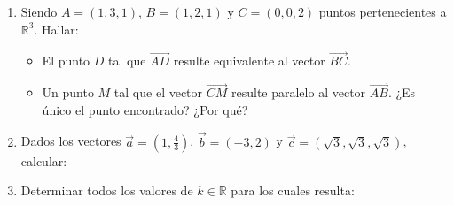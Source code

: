 \documentclass[11pt]{article}
\begin{document}
\begin{enumerate}[\hspace{-3mm}$1)$]
\item  Siendo $A = (1, 3, 1)$, $B = (1, 2, 1)$ y $C = (0, 0, 2)$ puntos pertenecientes a $\mathbb{R}^3$. Hallar:

    \begin{itemize}
        \item[a)] El punto $D$ tal que $\overrightarrow{AD}$ resulte equivalente al vector $\overrightarrow{BC}$.
        \item[b)] Un punto $M$ tal que el vector $\overrightarrow{CM}$ resulte paralelo al vector $\overrightarrow{AB}$. ¿Es único el punto encontrado? ¿Por qué?
    \end{itemize}











\item  Dados los vectores $\vec{a} = \left(1, \frac{4}{3}\right)$, $\vec{b} = (-3, 2)$ y $\vec{c} = \left(\sqrt{3}, \sqrt{3}, \sqrt{3}\right)$, calcular:

    \begin{itemize}
    \end{itemize}
 








\item  Determinar todos los valores de $k \in \mathbb{R}$ para los cuales resulta:

    \begin{itemize}
    \end{itemize}












\end{enumerate}
\end{document}
